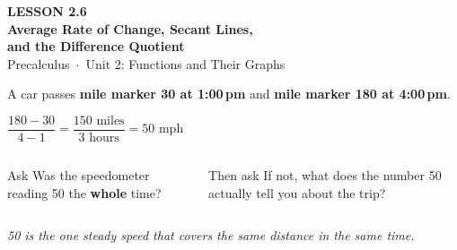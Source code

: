 \documentclass[aspectratio=169, 11pt]{beamer}
\begin{document}
{
\begin{frame}[plain]
  \vspace{2.6cm}\hspace{0.55cm}%
  \begin{minipage}{0.9\textwidth}
    {\color{goldacc}\bfseries\small LESSON 2.6}\\[0.5cm]
    {\color{white}\bfseries\LARGE Average Rate of Change, Secant Lines,\\[4pt] and the Difference Quotient}\\[1.0cm]
    {\color{lilacmid}\small Precalculus~$\cdot$~Unit 2: Functions and Their Graphs}
  \end{minipage}
\end{frame}
}

\begin{frame}[t, plain]

  A car passes \textbf{mile marker 30 at 1:00\,pm} and \textbf{mile marker 180 at 4:00\,pm}.

  \bigskip
  \begin{center}
    {\Large\bfseries\color{plum} \(\dfrac{180 - 30}{4 - 1} = \dfrac{150 \text{ miles}}{3 \text{ hours}} = 50 \text{ mph}\)}
  \end{center}

  \bigskip
  \begin{columns}[T]
      \begin{block}{Ask}
        Was the speedometer reading 50 the \textbf{whole} time?
      \end{block}
      \begin{block}{Then ask}
        If not, what does the number 50 actually tell you about the trip?
      \end{block}
  \end{columns}

  \bigskip
  \textit{50 is the one steady speed that covers the same distance in the same time.}
\end{frame}
\end{document}
